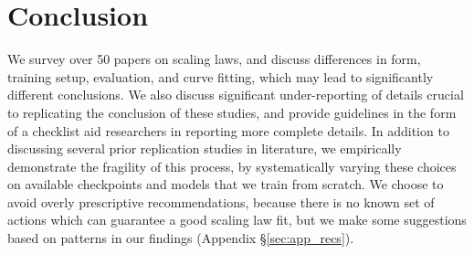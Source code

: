 \section{Conclusion}\label{sec:conclusion}

We survey over 50 papers on scaling laws, and discuss differences in form, training setup, evaluation, and curve fitting, which may lead to significantly different conclusions. We also discuss significant under-reporting of details crucial to replicating the conclusion of these studies, and provide guidelines in the form of a checklist aid researchers in reporting more complete details. In addition to discussing several prior replication studies in literature, we empirically demonstrate the fragility of this process, by systematically varying these choices on available checkpoints and models that we train from scratch.
We choose to avoid overly prescriptive recommendations, because there is no known set of actions which can guarantee a good scaling law fit, but we make some suggestions based on patterns in our findings (Appendix \S\ref{sec:app_recs}).
